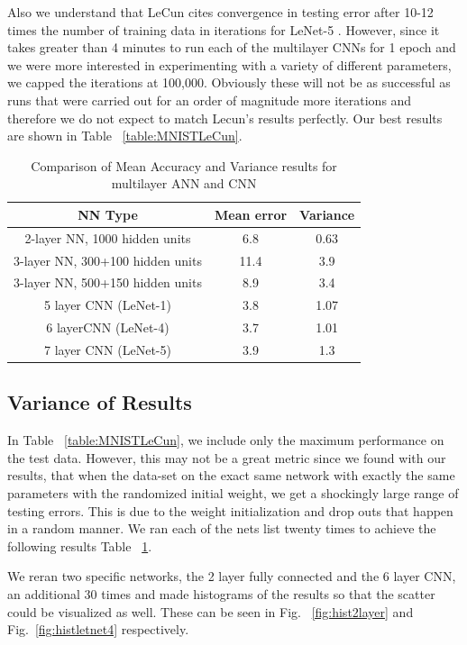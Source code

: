 \documentclass[12pt, twocolumn]{article}
\begin{document}
Also we understand that LeCun cites convergence in testing error after 10-12 times the number of training data in iterations for LeNet-5 \cite{LeCun1998}. However, since it takes greater than 4 minutes to run each of the multilayer CNNs for 1 epoch and we were more interested in experimenting with a variety of different parameters, we capped the iterations at 100,000. Obviously these will not be as successful as runs that were carried out for an order of magnitude more iterations and therefore we do not expect to match Lecun's results perfectly.  Our best results are shown in Table ~\ref{table:MNISTLeCun}. 

\begin{table}
	\begin{center}
		\begin{tabular} { |c | c | c | }
			\hline
			NN Type & Mean error &   Variance\\ \hline
			2-layer NN, 1000 hidden units & 6.8  & 0.63\\ \hline
			3-layer NN, 300+100 hidden units & 11.4  & 3.9 \\ \hline
			3-layer NN, 500+150 hidden units & 8.9  & 3.4\\ \hline
			5 layer CNN  (LeNet-1) & 3.8  & 1.07 \\ \hline 
			6 layerCNN (LeNet-4) & 3.7 & 1.01\\ \hline 
			7 layer CNN (LeNet-5) &  3.9  &1.3\\ \hline
		\end{tabular}		
		\caption{Comparison of Mean Accuracy and Variance results for multilayer ANN and CNN}
		\label{table:variance}
	\end{center}
\end{table}

\subsection{Variance of Results}
In Table ~\ref{table:MNISTLeCun}, we include only the maximum performance on the test data. However, this may not be a great metric since we found with our results, that when the data-set on the exact same network with exactly the same parameters with the randomized initial weight, we get a shockingly large range of testing errors. This is due to the weight initialization and drop outs that happen in a random manner. We ran each of the nets list twenty times  to achieve the following results Table ~\ref{table:variance}. 

We reran two specific networks, the 2 layer fully connected and the 6 layer CNN, an additional 30 times and made histograms of the results so that the scatter could be visualized as well. These can be seen in Fig. ~\ref{fig:hist2layer} and Fig.~\ref{fig:histletnet4} respectively. 
\end{document}
